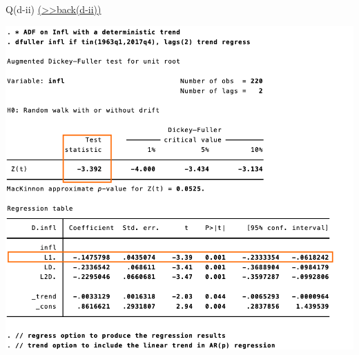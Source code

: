 \documentclass[
  10pt,
  ignorenonframetext,
]{beamer}
\begin{document}
\begin{frame}{Q(d-ii)
\footnotesize \protect\hyperlink{ADFtest-deterministic-A}{(\textgreater\textgreater back(d-ii))}
\normalsize }
\protect\hypertarget{ADFtest-deterministic}{}
\begin{flushleft}\includegraphics[width=0.7\linewidth]{pictures/(d-ii)ADFtest-deterministic} \end{flushleft}
\end{frame}
\end{document}
